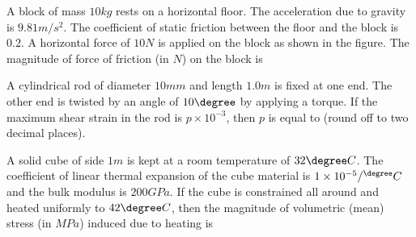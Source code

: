     \item A block of mass $10 kg$ rests on a horizontal floor. The acceleration due to gravity is $9.81 m/s^2$. The coefficient of static friction between the floor and the block is $0.2$. A horizontal force of $10 N$ is applied on the block as shown in the figure. The magnitude of force of friction (in $N$) on the block is \underline{\hspace{1cm}}
        \begin{figure}[!ht]
            \centering
        \end{figure}

    \item  A cylindrical rod of diameter $10 mm$ and length $1.0 m$ is fixed at one end. The other end is twisted by an angle of $10\degree$ by applying a torque. If the maximum shear strain in the rod is $p\times10^{-3}$, then $p$ is equal to \underline{\hspace{1cm}} (round off to two decimal places).

    \item A solid cube of side $1 m$ is kept at a room temperature of $32 \degree C$. The coefficient of linear thermal expansion of the cube material is $1\times 10^{-5}/{}^{\degree} C$ and the bulk modulus is $200 GPa$. If the cube is constrained all around and heated uniformly to $42 \degree C$, then the magnitude of volumetric (mean) stress (in $MPa$) induced due to heating is \underline{\hspace{1cm}}

